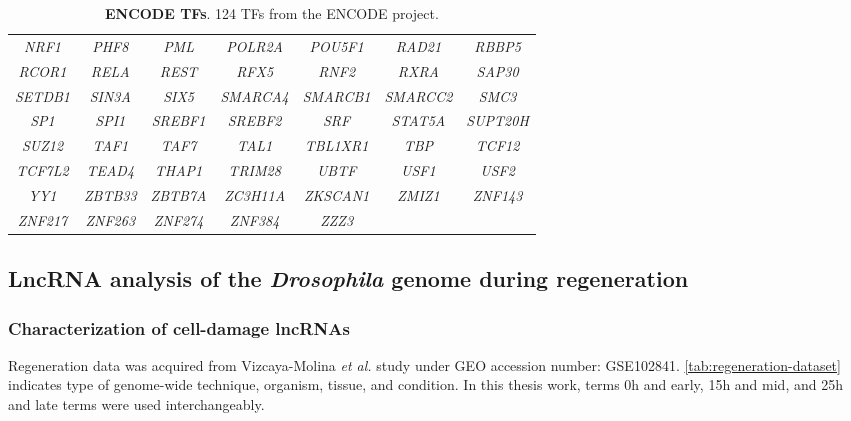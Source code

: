 \begin{table}[!htb]
  \caption[ENCODE TFs]{\textbf{ENCODE TFs}. 124 TFs from the ENCODE project.\autocite{encode_2004,encode_2011_user}}
  \begin{scriptsize}
    \begin{tabulary}{0.95\linewidth}{ccccccc}
      \textit{NRF1} &   \textit{PHF8} &  \textit{PML}  &  \textit{POLR2A} & \textit{POU5F1} &  \textit{RAD21}  &  \textit{RBBP5}  \\
      \textit{RCOR1} &  \textit{RELA} &  \textit{REST} &  \textit{RFX5} &  \textit{RNF2}  &  \textit{RXRA}  & \textit{SAP30}  \\
      \textit{SETDB1} &  \textit{SIN3A} &  \textit{SIX5} &  \textit{SMARCA4} & \textit{SMARCB1} & \textit{SMARCC2} & \textit{SMC3}   \\
      \textit{SP1} & \textit{SPI1}  & \textit{SREBF1} & \textit{SREBF2} & \textit{SRF} & \textit{STAT5A} & \textit{SUPT20H} \\
      \textit{SUZ12} & \textit{TAF1}  &  \textit{TAF7} &  \textit{TAL1} & \textit{TBL1XR1} & \textit{TBP}  &  \textit{TCF12}  \\
      \textit{TCF7L2} &  \textit{TEAD4} &  \textit{THAP1} &  \textit{TRIM28}  & \textit{UBTF} & \textit{USF1} & \textit{USF2}   \\
      \textit{YY1} & \textit{ZBTB33} & \textit{ZBTB7A} & \textit{ZC3H11A} & \textit{ZKSCAN1} & \textit{ZMIZ1} & \textit{ZNF143} \\
      \textit{ZNF217} & \textit{ZNF263} & \textit{ZNF274} & \textit{ZNF384} & \textit{ZZZ3} \\
    \end{tabulary}
  \end{scriptsize}
  \label{tab:encode-tfs}
\end{table}

\subsection{LncRNA analysis of the \textit{Drosophila} genome during regeneration}
\label{sec:genome_datasets_first_part}

\subsubsection{Characterization of cell-damage lncRNAs}
\label{sec:materials-dme-one}

Regeneration data was acquired from Vizcaya-Molina \textit{et al.} study\autocite{vizcaya_2018} under GEO accession number: GSE102841. \autoref{tab:regeneration-dataset} indicates type of genome-wide technique, organism, tissue, and condition. In this thesis work, terms 0h and early, 15h and mid, and 25h and late terms were used interchangeably. 

